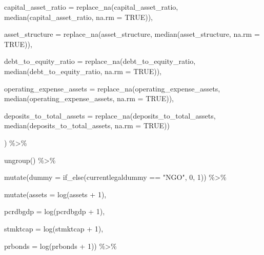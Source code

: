 \documentclass[a4paper,nobind]{templates/ociamthesis}
\newenvironment{Shaded}{\begin{snugshade}}{\end{snugshade}}
\newcommand{\AttributeTok}[1]{\textcolor[rgb]{0.77,0.63,0.00}{#1}}
\newcommand{\ConstantTok}[1]{\textcolor[rgb]{0.00,0.00,0.00}{#1}}
\newcommand{\DecValTok}[1]{\textcolor[rgb]{0.00,0.00,0.81}{#1}}
\newcommand{\FunctionTok}[1]{\textcolor[rgb]{0.00,0.00,0.00}{#1}}
\newcommand{\NormalTok}[1]{#1}
\newcommand{\SpecialCharTok}[1]{\textcolor[rgb]{0.00,0.00,0.00}{#1}}
\newcommand{\StringTok}[1]{\textcolor[rgb]{0.31,0.60,0.02}{#1}}
\renewenvironment{Shaded}
{
  \vspace{10pt}%
  \begin{snugshade}%
}{%
  \end{snugshade}%
  \vspace{8pt}%
}
\begin{document}
\begin{Shaded}
\begin{Highlighting}[]
         \AttributeTok{capital\_asset\_ratio =} \FunctionTok{replace\_na}\NormalTok{(capital\_asset\_ratio, }\FunctionTok{median}\NormalTok{(capital\_asset\_ratio, }\AttributeTok{na.rm =} \ConstantTok{TRUE}\NormalTok{)),}
         
         \AttributeTok{asset\_structure =} \FunctionTok{replace\_na}\NormalTok{(asset\_structure, }\FunctionTok{median}\NormalTok{(asset\_structure, }\AttributeTok{na.rm =} \ConstantTok{TRUE}\NormalTok{)),}
         
         \AttributeTok{debt\_to\_equity\_ratio =} \FunctionTok{replace\_na}\NormalTok{(debt\_to\_equity\_ratio, }\FunctionTok{median}\NormalTok{(debt\_to\_equity\_ratio, }\AttributeTok{na.rm =} \ConstantTok{TRUE}\NormalTok{)),}
         
         \AttributeTok{operating\_expense\_assets =} \FunctionTok{replace\_na}\NormalTok{(operating\_expense\_assets, }\FunctionTok{median}\NormalTok{(operating\_expense\_assets, }\AttributeTok{na.rm =} \ConstantTok{TRUE}\NormalTok{)),}
         
         \AttributeTok{deposits\_to\_total\_assets =} \FunctionTok{replace\_na}\NormalTok{(deposits\_to\_total\_assets, }\FunctionTok{median}\NormalTok{(deposits\_to\_total\_assets, }\AttributeTok{na.rm =} \ConstantTok{TRUE}\NormalTok{))}
         
\NormalTok{         ) }\SpecialCharTok{\%\textgreater{}\%} 
  
  \FunctionTok{ungroup}\NormalTok{() }\SpecialCharTok{\%\textgreater{}\%} 
  
  \FunctionTok{mutate}\NormalTok{(}\AttributeTok{dummy =} \FunctionTok{if\_else}\NormalTok{(currentlegaldummy }\SpecialCharTok{==} \StringTok{"NGO"}\NormalTok{, }\DecValTok{0}\NormalTok{, }\DecValTok{1}\NormalTok{)) }\SpecialCharTok{\%\textgreater{}\%} 
  
  \FunctionTok{mutate}\NormalTok{(}\AttributeTok{assets =} \FunctionTok{log}\NormalTok{(assets }\SpecialCharTok{+} \DecValTok{1}\NormalTok{),}
         
         \AttributeTok{pcrdbgdp =} \FunctionTok{log}\NormalTok{(pcrdbgdp }\SpecialCharTok{+} \DecValTok{1}\NormalTok{),}
         
         \AttributeTok{stmktcap =} \FunctionTok{log}\NormalTok{(stmktcap }\SpecialCharTok{+} \DecValTok{1}\NormalTok{),}
         
         \AttributeTok{prbonds =} \FunctionTok{log}\NormalTok{(prbonds }\SpecialCharTok{+} \DecValTok{1}\NormalTok{)) }\SpecialCharTok{\%\textgreater{}\%} 
  

\end{Highlighting}
\end{Shaded}
\end{document}
